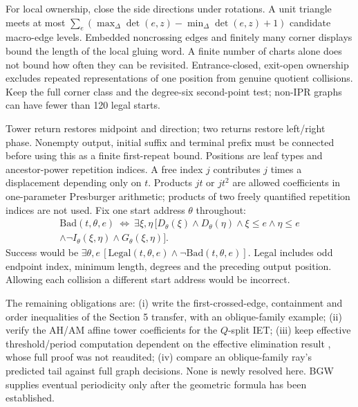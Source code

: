 \documentclass[11pt]{amsart}
\theoremstyle{definition}\newtheorem{definition}{Definition}
\begin{document}
For local ownership, close the side directions under rotations. A
unit triangle meets at most
$\sum_e(\max_\Delta\det(e,z)-\min_\Delta\det(e,z)+1)$
candidate macro-edge levels. Embedded noncrossing edges and finitely
many corner displays bound the length of the local gluing word.
A finite number of charts alone does not bound how often they can
be revisited. Entrance-closed, exit-open ownership excludes repeated
representations of one position from genuine quotient collisions.
Keep the full corner class and the degree-six second-point test;
non-IPR graphs can have fewer than 120 legal starts.

Tower return restores midpoint and direction; two returns restore
left/right phase. Nonempty output, initial suffix and terminal prefix
must be connected before using this as a finite first-repeat bound.
Positions are leaf types and ancestor-power repetition indices.
A free index $j$ contributes $j$ times a displacement depending only
on $t$. Products $jt$ or $jt^2$ are allowed coefficients in one-parameter
Presburger arithmetic; products of two freely quantified repetition
indices are not used. Fix one start address $\theta$ throughout:
\[
\begin{split}
\mathrm{Bad}(t,\theta,e)\ \Longleftrightarrow\
\exists\xi,\eta\,[D_\theta(\xi)\wedge D_\theta(\eta)
\wedge\xi\le e\wedge\eta\le e\\
\wedge\neg I_\theta(\xi,\eta)\wedge G_\theta(\xi,\eta)].
\end{split}
\]
Success would be $\exists\theta,e\,[\mathrm{Legal}(t,\theta,e)
\wedge\neg\mathrm{Bad}(t,\theta,e)]$. Legal includes odd endpoint index,
minimum length, degrees and the preceding output position. Allowing
each collision a different start address would be incorrect.

The remaining obligations are: (i) write the first-crossed-edge,
containment and order inequalities of the Section 5 transfer, with an
oblique-family example; (ii) verify the AH/AM affine tower coefficients
for the $Q$-split IET; (iii) keep effective threshold/period computation
dependent on the effective elimination result \cite{QE}, whose full
proof was not reaudited; (iv) compare an oblique-family ray's predicted
tail against full graph decisions. None is newly resolved here.
BGW supplies eventual periodicity only after the geometric formula
has been established.
\end{document}
